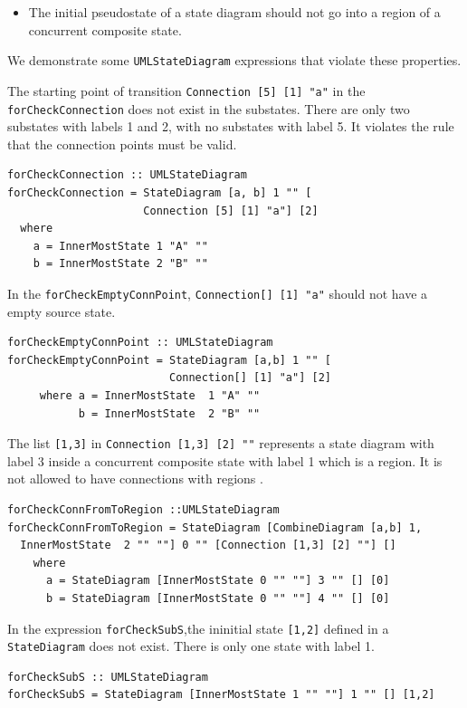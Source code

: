 \begin{itemize}
\item The initial pseudostate of a state diagram should not go into a region of a concurrent composite state.
\end{itemize}

We demonstrate some \verb|UMLStateDiagram| expressions that violate these properties.

The starting point of transition \verb|Connection [5] [1] "a"| in the \verb|forCheckConnection| does not exist in the substates. 
There are only two substates with labels 1 and  2, with no substates with label 5.
It violates the rule that the connection points must be valid.
\begin{verbatim}
forCheckConnection :: UMLStateDiagram
forCheckConnection = StateDiagram [a, b] 1 "" [
                     Connection [5] [1] "a"] [2]
  where
    a = InnerMostState 1 "A" ""
    b = InnerMostState 2 "B" ""
\end{verbatim}

In the \verb|forCheckEmptyConnPoint|, \verb|Connection[] [1] "a"| should not have a empty source state.
\begin{verbatim}
forCheckEmptyConnPoint :: UMLStateDiagram
forCheckEmptyConnPoint = StateDiagram [a,b] 1 "" [
                         Connection[] [1] "a"] [2]
     where a = InnerMostState  1 "A" ""
           b = InnerMostState  2 "B" ""
\end{verbatim}

The list \verb|[1,3]| in \verb|Connection [1,3] [2] ""| represents a state diagram with label 3 inside a concurrent composite state with label 1 which is a region.
It is not allowed to have connections with regions .
\begin{verbatim}
forCheckConnFromToRegion ::UMLStateDiagram
forCheckConnFromToRegion = StateDiagram [CombineDiagram [a,b] 1,
  InnerMostState  2 "" ""] 0 "" [Connection [1,3] [2] ""] []
    where
      a = StateDiagram [InnerMostState 0 "" ""] 3 "" [] [0]
      b = StateDiagram [InnerMostState 0 "" ""] 4 "" [] [0] 
\end{verbatim}

In the expression \verb|forCheckSubS|,the ininitial state \verb|[1,2]|  defined in a \verb|StateDiagram| does not exist.
There is only one state with label 1.
\begin{verbatim}
forCheckSubS :: UMLStateDiagram
forCheckSubS = StateDiagram [InnerMostState 1 "" ""] 1 "" [] [1,2] 
\end{verbatim}


